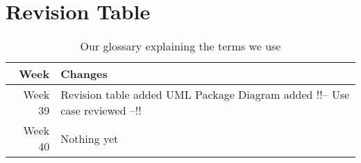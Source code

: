 \section{Revision Table}
\begin{table*}[ht]\centering
  \begin{tabularx}{\textwidth}{@{}rX@{}}
    \toprule
    \textbf{Week} & \textbf{Changes} \\\hline
    Week 39 & Revision table added\newline  
    		UML Package Diagram added \newline
    		!!--  Use case reviewed --!!\\\hline
    Week 40 & Nothing yet\\
    \bottomrule
  \end{tabularx}
  \caption{Our glossary explaining the terms we use}
  \label{glossary}\centering
\end{table*}
\newpage